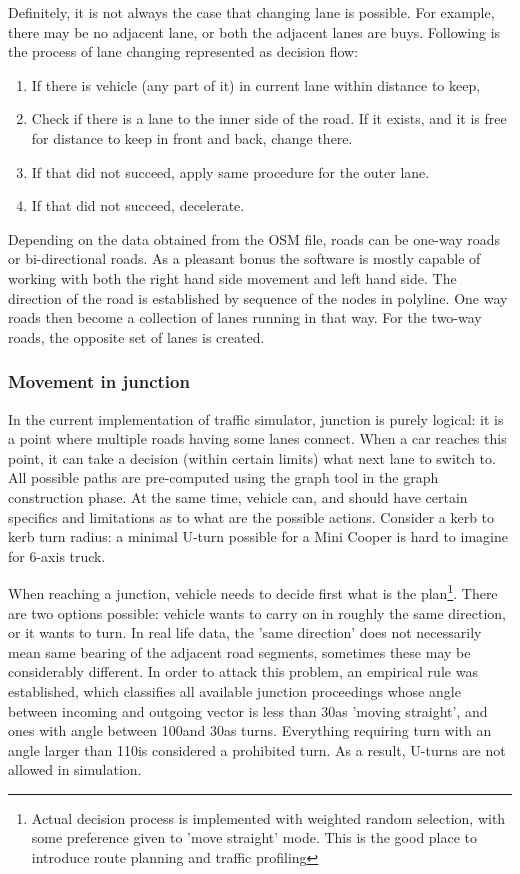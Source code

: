Definitely, it is not always the case that changing lane is possible. For example, there may be no adjacent lane, or both the adjacent lanes are buys. Following is the process of lane changing represented as decision flow:
\begin{enumerate}
    \item If there is vehicle (any part of it) in current lane within distance to keep,
    \item Check if there is a lane to the inner side of the road. If it exists, and it is free for distance to keep in front and back, change there.
    \item If that did not succeed, apply same procedure for the outer lane.
    \item If that did not succeed, decelerate.
\end{enumerate}

Depending on the data obtained from the OSM file, roads can be one-way roads or bi-directional roads. As a pleasant bonus the software is mostly capable of working with both the right hand side movement and left hand side. The direction of the road is established by sequence of the nodes in polyline. One way roads then become a collection of lanes running in that way. For the two-way roads, the opposite set of lanes is created.

\subsubsection{Movement in junction}
In the current implementation of traffic simulator, junction is purely logical: it is a point where multiple roads having some lanes connect. When a car reaches this point, it can take a decision (within certain limits) what next lane to switch to. All possible paths are pre-computed using the graph tool in the graph construction phase. At the same time, vehicle can, and should have certain specifics and limitations as to what are the possible actions. Consider a kerb to kerb turn radius: a minimal U-turn possible for a Mini Cooper is hard to imagine for 6-axis truck.

When reaching a junction, vehicle needs to decide first what is the plan\footnote{Actual decision process is implemented with weighted random selection, with some preference given to 'move straight' mode. This is the good place to introduce route planning and traffic profiling}. There are two options possible: vehicle wants to carry on in roughly the same direction, or it wants to turn. In real life data, the 'same direction' does not necessarily mean same bearing of the adjacent road segments, sometimes these may be considerably different. In order to attack this problem, an empirical rule was established, which classifies all available junction proceedings whose angle between incoming and outgoing vector is less than 30\degspc  as 'moving straight', and ones with angle between 100\degspc  and 30\degspc as turns. Everything requiring turn with an angle larger than 110\degspc is considered a prohibited turn. As a result, U-turns are not allowed in simulation.

